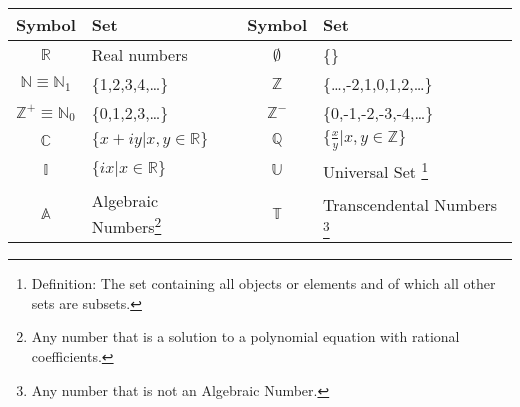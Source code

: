 \begin{fancybox}{}
	\begin{center}
		\begin{tabular}{c|l||c|l}
			Symbol &  Set  & Symbol & Set   \\
			\hline
			$\mathbb{R}$ & Real numbers & $\emptyset$ & \{\} \\
			$\mathbb{N}\equiv \mathbb{N}_1$ & \{1,2,3,4,\dots\} & $\mathbb{Z}$ & \{\dots,-2,1,0,1,2,\dots\} \\
			$\mathbb{Z}^+ \equiv \mathbb{N}_0$ & \{0,1,2,3,\dots\} & $\mathbb{Z}^-$ & \{0,-1,-2,-3,-4,\dots\} \\
			$\mathbb{C}$ & $\{x+iy | x,y \in \mathbb{R}\}$ & $\mathbb{Q}$ & $\{\frac{x}{y} | x,y \in \mathbb{Z}\}$ \\
			$\mathbb{I}$ & $\{ix|x\in \mathbb{R}\}$ & $\mathbb{U}$ & Universal Set \footnote{Definition: The set containing all objects or elements and of which all other sets are subsets.} \\
			$\mathbb{A}$ & Algebraic Numbers\footnote{Any number that is a solution to a polynomial equation with rational coefficients.} & $\mathbb{T}$ & Transcendental Numbers \footnote{Any number that is not an Algebraic Number.} 
		\end{tabular}
	\end{center}
\end{fancybox}

